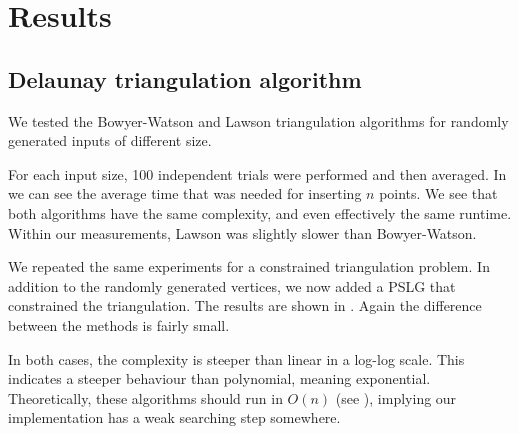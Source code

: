 \section{Results}
\label{sec:results}

\subsection{Delaunay triangulation algorithm}
\label{sub:results:triangulation}

We tested the Bowyer-Watson and Lawson triangulation algorithms for randomly generated inputs of different size.

For each input size, 100 independent trials were performed and then averaged.
In  we can see the average time that was needed for inserting $n$ points.
We see that both algorithms have the same complexity, and even effectively the same runtime.
Within our measurements, Lawson was slightly slower than Bowyer-Watson.


We repeated the same experiments for a constrained triangulation problem.
In addition to the randomly generated vertices, we now added a PSLG that constrained the triangulation.
The results are shown in .
Again the difference between the methods is fairly small.

In both cases, the complexity is steeper than linear in a log-log scale.
This indicates a steeper behaviour than polynomial, meaning exponential.
Theoretically, these algorithms should run in $O(n)$ (see ), implying our implementation has a weak searching step somewhere.

